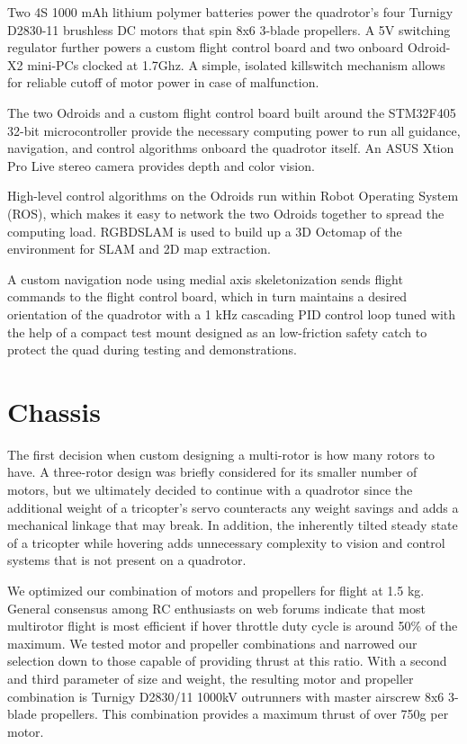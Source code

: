 \documentclass[12pt,letterpaper]{article} \usepackage[margin=1in]{geometry}
\begin{document}
Two 4S 1000 mAh lithium polymer batteries power the quadrotor's four Turnigy
D2830-11 brushless DC motors that spin 8x6 3-blade propellers. A 5V switching
regulator further powers a custom flight control board and two onboard
Odroid-X2 mini-PCs clocked at 1.7Ghz. A simple, isolated killswitch mechanism
allows for reliable cutoff of motor power in case of malfunction.

The two Odroids and a custom flight control board built around the STM32F405
32-bit microcontroller provide the necessary computing power to run all
guidance, navigation, and control algorithms onboard the quadrotor itself. An
ASUS Xtion Pro Live stereo camera provides depth and color vision. 

High-level control algorithms on the Odroids run within Robot Operating System
(ROS), which makes it easy to network the two Odroids together to spread the
computing load. RGBDSLAM is used to build up a 3D Octomap of the environment
for SLAM and 2D map extraction.

A custom navigation node using medial axis skeletonization sends flight
commands to the flight control board, which in turn maintains a desired
orientation of the quadrotor with a 1 kHz cascading PID control loop tuned with
the help of a compact test mount designed as an low-friction safety catch to
protect the quad during testing and demonstrations.



\section*{Chassis}

The first decision when custom designing a multi-rotor is how many rotors to
have. A three-rotor design was briefly considered for its smaller number of
motors, but we ultimately decided to continue with a quadrotor since the
additional weight of a tricopter's servo counteracts any weight savings and
adds a mechanical linkage that may break. In addition, the inherently tilted
steady state of a tricopter while hovering adds unnecessary complexity to
vision and control systems that is not present on a quadrotor.

We optimized our combination of motors and propellers for flight at 1.5 kg.
General consensus among RC enthusiasts on web forums indicate that most
multirotor flight is most efficient if hover throttle duty cycle is around 50\%
of the maximum. We tested motor and propeller combinations and narrowed our
selection down to those capable of providing thrust at this ratio. With
a second and third parameter of size and weight, the resulting motor and
propeller combination is Turnigy D2830/11 1000kV outrunners with master
airscrew 8x6 3-blade propellers. This combination provides a maximum thrust of
over 750g per motor.
\end{document}
